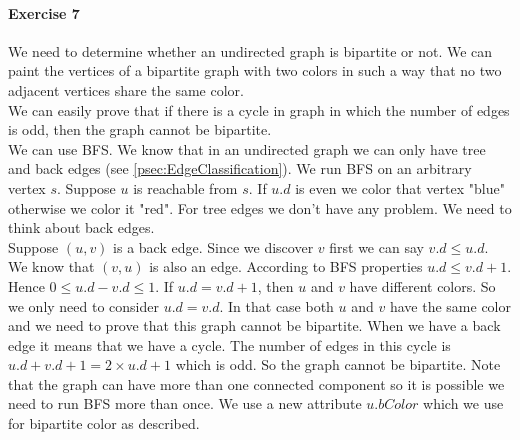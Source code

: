 \documentclass{book}
\begin{document}
	\paragraph{Exercise 7}
	We need to determine whether an undirected graph is bipartite or not. We can paint the vertices of a bipartite graph with two colors in such a way that no two adjacent vertices share the same color.\\
	We can easily prove that if there is a cycle in graph in which the number of edges is odd, then the graph cannot be bipartite. \\
	We can use BFS. We know that in an undirected graph we can only have tree and back edges (see \ref{psec:EdgeClassification}). We run BFS on an arbitrary vertex $s$. Suppose $u$ is reachable from $s$. If $u.d$ is even we color that vertex "blue" otherwise we color it "red". For tree edges we don't have any problem. We need to think about back edges. \\
	Suppose $(u, v)$ is a back edge. Since we discover $v$ first we can say $v.d \le u.d$. We know that $(v, u)$ is also an edge. According to BFS properties $u.d \le v.d + 1$. Hence $0 \le u.d - v.d \le 1$. If $u.d = v.d + 1$, then $u$ and $v$ have different colors. So we only need to consider $u.d = v.d$. In that case both $u$ and $v$ have the same color and we need to prove that this graph cannot be bipartite. When we have a back edge it means that we have a cycle. The number of edges in this cycle is $u.d + v.d + 1 = 2 \times u.d + 1$ which is odd. So the graph cannot be bipartite. Note that the graph can have more than one connected component so it is possible we need to run BFS more than once. We use a new attribute $u.bColor$ which we use for bipartite color as described.
\end{document}
